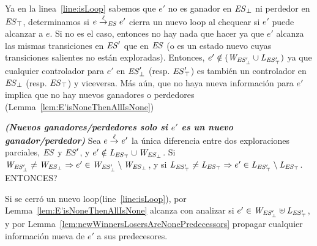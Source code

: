 Ya en la linea~\ref{line:isLoop} sabemos que $e'$ no es ganador en $\mathit{\mathit{ES}_{\bot}}$ ni perdedor en $\mathit{\mathit{ES}_{\top}}$, determinamos si $e 
\overset{\ell}{\rightarrow}_{\mathit{ES}} e'$ cierra un nuevo loop al chequear si $e'$ puede alcanzar a $e$. Si no es el caso, entonces no hay nada que hacer ya que $e'$ alcanza las mismas transiciones en $\mathit{ES}'$ que en $\mathit{ES}$ (o es un estado nuevo cuyas transiciones salientes no están exploradas). Entonces, $e' \notin 
(\mathit{W_{\mathit{\mathit{ES}'_{\bot}}}} \cup \mathit{L_{\mathit{\mathit{ES}'_{\top}}}})$ ya que cualquier controlador para $e'$ en $\mathit{\mathit{ES}'_{\bot}}$ (resp. $\mathit{\mathit{ES}'_{\top}}$) es también un controlador en $\mathit{\mathit{ES}_{\bot}}$ (resp. 
$\mathit{\mathit{ES}_{\top}}$) y viceversa.
%
%
Más aún, que no haya nueva información para $e'$ implica que no hay nuevos ganadores o perdedores (Lemma~\ref{lem:E'isNoneThenAllIsNone})

\begin{lemma}\textbf{\emph{(Nuevos ganadores/perdedores solo si $e'$ es un nuevo ganador/perdedor)}}
\label{lem:E'isNoneThenAllIsNone}
Sea $e \overset{\ell}{\rightarrow}_{} e'$ la única diferencia entre dos exploraciones parciales, $\mathit{ES}$ y $\mathit{ES}'$, y $e' \notin \mathit{L_{\mathit{\mathit{ES}_{\top}}}} \cup \mathit{W_{\mathit{\mathit{ES}_{\bot}}}}$. Si $\mathit{W_{\mathit{\mathit{ES}'_{\bot}}}} \neq \mathit{W_{\mathit{\mathit{ES}_{\bot}}}} \Rightarrow e' \in \mathit{W_{\mathit{\mathit{ES}'_{\bot}}}} \setminus \mathit{W_{\mathit{\mathit{ES}_{\bot}}}}$, y si $\mathit{L_{\mathit{\mathit{ES}'_{\top}}}} \neq \mathit{L_{\mathit{\mathit{ES}_{\top}}}} \Rightarrow e' \in \mathit{L_{\mathit{\mathit{ES}'_{\top}}}} \setminus \mathit{L_{\mathit{\mathit{ES}_{\top}}}}$. ENTONCES?
\end{lemma}


Si se cerró un nuevo loop(line~\ref{line:isLoop}), por Lemma~\ref{lem:E'isNoneThenAllIsNone} alcanza con analizar si $e' 
\in \mathit{W_{\mathit{\mathit{ES}'_{\bot}}}} \uplus \mathit{L_{\mathit{\mathit{ES}'_{\top}}}}$, y por Lemma~\ref{lem:newWinnersLosersAreNonePredecessors} propagar cualquier información nueva de $e'$ a sus predecesores. 

